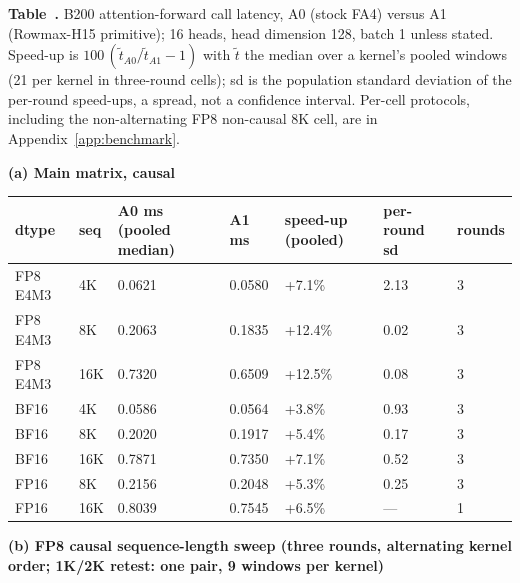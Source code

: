 \begingroup
{}%
\par\medskip\noindent{}\label{tab:appx-b200}{\small\textbf{Table~\thetable.} B200 attention-forward call latency, A0 (stock FA4) versus A1 (Rowmax-H15 primitive); 16 heads, head dimension 128, batch 1 unless stated.  Speed-up is \(100\,(\tilde t_{A0}/\tilde t_{A1}-1)\) with \(\tilde t\) the median over a kernel's pooled windows (21 per kernel in three-round cells); sd is the population standard deviation of the per-round speed-ups, a spread, not a confidence interval.  Per-cell protocols, including the non-alternating FP8 non-causal 8K cell, are in Appendix~\ref{app:benchmark}.}\par\smallskip
{}
\par\smallskip\noindent\textbf{(a) Main matrix, causal}\par\nopagebreak
{\scriptsize
\setlength{\tabcolsep}{2pt}
\begin{longtable}{@{}lllllll@{}}
\toprule
\textbf{dtype} & \textbf{seq} & \textbf{A0 ms (pooled median)} & \textbf{A1 ms} & \textbf{speed-up (pooled)} & \textbf{per-round sd} & \textbf{rounds} \\
\midrule
\endhead
FP8 E4M3 & 4K & 0.0621 & 0.0580 & +7.1\% & 2.13 & 3 \\
FP8 E4M3 & 8K & 0.2063 & 0.1835 & +12.4\% & 0.02 & 3 \\
FP8 E4M3 & 16K & 0.7320 & 0.6509 & +12.5\% & 0.08 & 3 \\
BF16 & 4K & 0.0586 & 0.0564 & +3.8\% & 0.93 & 3 \\
BF16 & 8K & 0.2020 & 0.1917 & +5.4\% & 0.17 & 3 \\
BF16 & 16K & 0.7871 & 0.7350 & +7.1\% & 0.52 & 3 \\
FP16 & 8K & 0.2156 & 0.2048 & +5.3\% & 0.25 & 3 \\
FP16 & 16K & 0.8039 & 0.7545 & +6.5\% & --- & 1 \\
\bottomrule
\end{longtable}
\addtocounter{table}{-1}
}
\par\smallskip\noindent\textbf{(b) FP8 causal sequence-length sweep (three rounds, alternating kernel order; 1K/2K retest: one pair, 9 windows per kernel)}\par\nopagebreak
